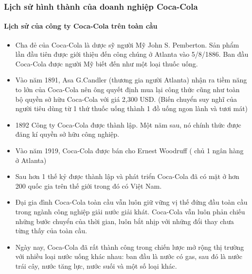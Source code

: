 \documentclass{article}
\begin{document}
    \subsubsection{Lịch sử hình thành của doanh nghiệp Coca-Cola}
        \paragraph{Lịch sử của công ty Coca-Cola trên toàn cầu}
        \begin{itemize}
            \item Cha đẻ của Coca-Cola là dược sỹ người Mỹ John S. Pemberton. Sản phẩm lần đầu tiên được giới thiệu đến công chúng ở Atlanta vào 5/8/1886. Ban đầu Coca-Cola được người Mỹ biết đến như một loại thuốc uống. 
            \item Vào năm 1891, Asa G.Candler (thương gia người Atlanta) nhận ra tiềm năng to lớn của Coca-Cola nên ông quyết định mua lại công thức cũng như toàn bộ quyền sở hữu  Coca-Cola với giá 2,300 USD. (Biến chuyển suy nghĩ của người tiêu dùng từ 1 thứ thuốc uống thành 1 đồ uống ngon lành và tươi mát)
            \item 1892 Công ty Coca-Cola được thành lập. Một năm sau, nó chính thức được đăng kí quyền sở hữu công nghiệp.
            \item Vào năm 1919,  Coca-Cola được bán cho Ernest Woodruff ( chủ 1 ngân hàng ở Atlanta)
            \item Sau hơn 1 thế kỷ được thành lập và phát triển Coca-Cola đã có mặt ở hơn 200 quốc gia trên thế giới trong đó có Việt Nam.
            \item Đại gia đình Coca-Cola toàn cầu vẫn luôn giữ vững vị thế đứng đầu toàn cầu trong ngành công nghiệp giải nước giải khát. Coca-Cola vẫn luôn phản chiếu những bước chuyển của thời gian, luôn bắt nhịp với những đổi thay chưa từng thấy của toàn cầu.
            \item Ngày nay, Coca-Cola đã rất thành công trong chiến lược mở rộng thị trường với nhiều loại nước uống khác nhau: ban đầu là nước có gas, sau đó là nước trái cây, nước tăng lực, nước suối và một số loại khác.
        \end{itemize}
\end{document}
